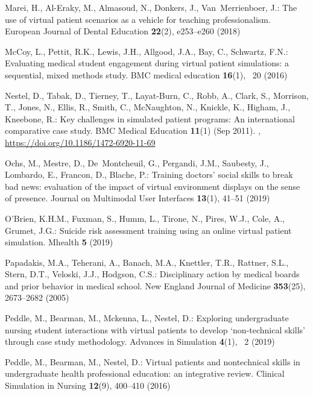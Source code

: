 \documentclass[runningheads]{llncs}
\begin{document}
\begin{thebibliography}{10}
Marei, H., Al-Eraky, M., Almasoud, N., Donkers, J., Van~Merrienboer, J.: The
  use of virtual patient scenarios as a vehicle for teaching professionalism.
  European Journal of Dental Education  \textbf{22}(2),  e253--e260 (2018)

McCoy, L., Pettit, R.K., Lewis, J.H., Allgood, J.A., Bay, C., Schwartz, F.N.:
  Evaluating medical student engagement during virtual patient simulations: a
  sequential, mixed methods study. BMC medical education  \textbf{16}(1), ~20
  (2016)

Nestel, D., Tabak, D., Tierney, T., Layat-Burn, C., Robb, A., Clark, S.,
  Morrison, T., Jones, N., Ellis, R., Smith, C., McNaughton, N., Knickle, K.,
  Higham, J., Kneebone, R.: Key challenges in simulated patient programs: An
  international comparative case study. {BMC} Medical Education  \textbf{11}(1)
  (Sep 2011). ,
  \url{https://doi.org/10.1186/1472-6920-11-69}

Ochs, M., Mestre, D., De~Montcheuil, G., Pergandi, J.M., Saubesty, J.,
  Lombardo, E., Francon, D., Blache, P.: Training doctors’ social skills to
  break bad news: evaluation of the impact of virtual environment displays on
  the sense of presence. Journal on Multimodal User Interfaces  \textbf{13}(1),
   41--51 (2019)

O’Brien, K.H.M., Fuxman, S., Humm, L., Tirone, N., Pires, W.J., Cole, A.,
  Grumet, J.G.: Suicide risk assessment training using an online virtual
  patient simulation. Mhealth  \textbf{5} (2019)

Papadakis, M.A., Teherani, A., Banach, M.A., Knettler, T.R., Rattner, S.L.,
  Stern, D.T., Veloski, J.J., Hodgson, C.S.: Disciplinary action by medical
  boards and prior behavior in medical school. New England Journal of Medicine
  \textbf{353}(25),  2673--2682 (2005)

Peddle, M., Bearman, M., Mckenna, L., Nestel, D.: Exploring undergraduate
  nursing student interactions with virtual patients to develop
  ‘non-technical skills’ through case study methodology. Advances in
  Simulation  \textbf{4}(1), ~2 (2019)

Peddle, M., Bearman, M., Nestel, D.: Virtual patients and nontechnical skills
  in undergraduate health professional education: an integrative review.
  Clinical Simulation in Nursing  \textbf{12}(9),  400--410 (2016)


\end{thebibliography}
\end{document}
